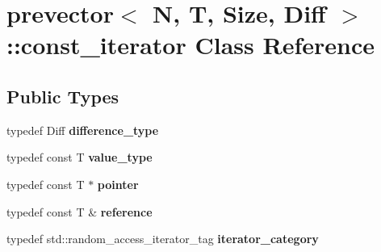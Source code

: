 \hypertarget{classprevector_1_1const__iterator}{}\section{prevector$<$ N, T, Size, Diff $>$\+::const\+\_\+iterator Class Reference}
\label{classprevector_1_1const__iterator}
\subsection*{Public Types}
\begin{DoxyCompactItemize}
\item 
\mbox{\label{classprevector_1_1const__iterator_a8c3d9b22578d2b87f14513d523b151e9}} 
typedef Diff {\bfseries difference\+\_\+type}
\item 
\mbox{\label{classprevector_1_1const__iterator_a5eb2ebba5993718446f0439d79b7157d}} 
typedef const T {\bfseries value\+\_\+type}
\item 
\mbox{\label{classprevector_1_1const__iterator_a66b8b55134c8336e8beccf4669c6a32c}} 
typedef const T $\ast$ {\bfseries pointer}
\item 
\mbox{\label{classprevector_1_1const__iterator_a0e0ec121eb938f268419ab5945fcda33}} 
typedef const T \& {\bfseries reference}
\item 
\mbox{\label{classprevector_1_1const__iterator_a378da53ceeb29f7e1c9370fe99f0df50}} 
typedef std\+::random\+\_\+access\+\_\+iterator\+\_\+tag {\bfseries iterator\+\_\+category}
\end{DoxyCompactItemize}
